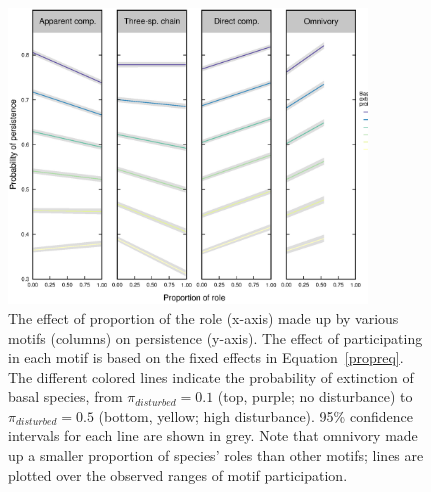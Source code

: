 \documentclass[12pt]{article}
\begin{document}
\begin{spacing}{2.0}
    \begin{figure}[hb!]
        \centering
        \includegraphics[width=0.85\textwidth]{figures/persistence_vs_motifs.eps}
        \caption{The effect of proportion of the role (x-axis) made up by various motifs (columns) on persistence (y-axis). The effect of participating in each motif is based on the fixed effects in Equation~\ref{propreq}. The different colored lines indicate the probability of extinction of basal species, from $\pi_{disturbed} = 0.1$ (top, purple; no disturbance) to $\pi_{disturbed} = 0.5$ (bottom, yellow; high disturbance). 95\% confidence intervals for each line are shown in grey. Note that omnivory made up a smaller proportion of species' roles than other motifs; lines are plotted over the observed ranges of motif participation.}
    \label{fig:prop_lmer_all}
    \end{figure}
        


\end{spacing}
\end{document}
